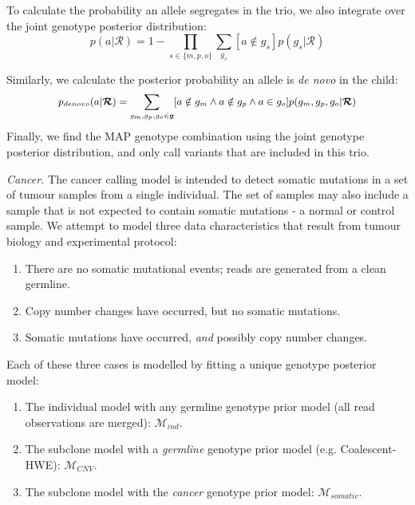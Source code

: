 \documentclass[notitlepage, twocolumn, 10pt]{article}
\begin{document}
To calculate the probability an allele segregates in the trio, we also integrate over the joint genotype posterior distribution:
\begin{equation*}
p(a | \boldsymbol{\mathcal{R}}) = 1 - \prod_{s \in \{m, p, o\}}\sum_{g_s} [a \notin g_s]p(g_s | \boldsymbol{\mathcal{R}})
\end{equation*}

Similarly, we calculate the posterior probability an allele is \textit{de novo} in the child:
\begin{equation*}
\small
p_{denovo}(a | \boldsymbol{\mathcal{R}}) = \sum_{g_m, g_p, g_o \in \boldsymbol{g}} [a \notin g_m \land a \notin g_p \land a \in g_o] p(g_m, g_p, g_o | \boldsymbol{\mathcal{R}})
\end{equation*}
Finally, we find the MAP genotype combination using the joint genotype posterior distribution, and only call variants that are included in this trio.

\vspace{3mm}
\noindent\emph{Cancer.} The cancer calling model is intended to detect somatic mutations in a set of tumour samples from a single individual. The set of samples may also include a sample that is not expected to contain somatic mutations - a normal or control sample. We attempt to model three data characteristics that result from tumour biology and experimental protocol: 

\begin{enumerate}[i]
	\item There are no somatic mutational events; reads are generated from a clean germline.
	\item Copy number changes have occurred, but no somatic mutations.
    \item Somatic mutations have occurred, \emph{and} possibly copy number changes.
\end{enumerate}

Each of these three cases is modelled by fitting a unique genotype posterior model:

\begin{enumerate}[i]
	\item The individual model with any germline genotype prior model (all read observations are merged): $\mathcal{M}_{ind}$.
	\item The subclone model with a \emph{germline} genotype prior model (e.g. Coalescent-HWE): $\mathcal{M}_{CNV}$.
    \item The subclone model with the \emph{cancer} genotype prior model: $\mathcal{M}_{somatic}$.
\end{enumerate}
\end{document}
